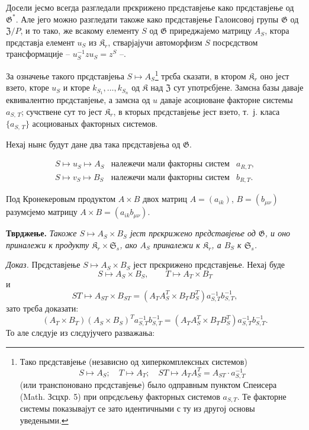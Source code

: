 \documentclass[11pt]{article}
\newcommand{\srcfn}[2]{\footnote{#2}}
\begin{document}
Досели јесмо всегда разгледали прєкрижено прєдставјење како прєдставјење од \(\mathfrak{G}^*\). Але јего можно разгледати такоже како прєдставјење Галоисовој групы \(\mathfrak{G}\) од \(\mathfrak Z/P\), и то тако, же всакому елементу \(S\) од \(\mathfrak{G}\) приреджајемо матрицу \(A_S\), ктора прєдставја елемент \(u_S\) из \(\mathfrak K_r\), стварјајучи автоморфизм \(S\) посрєдством трансформације -- \(u_S^{-1}zu_S=z^S\) --.

За означење такого прєдставјења \(S\mapsto A_S\)\srcfn{1}{Тако прєдставјење (независно од хиперкомплексных системов)
\[
S\mapsto A_S;\quad T\mapsto A_T;\quad ST\mapsto A_TA_S^T=A_{ST}\cdot a_{S,T}^{-1}
\]
(или транспоновано прєдставјење) было одправным пунктом Спеисера (Math. Зсцхр. 5) при опрєдєљењу факторных системов \(a_{S,T}\). Те факторне системы показывајут се зато идентичными с ту из другој основы уведеными.} трєба сказати, в ктором \(\mathfrak K_r\) оно јест взето, кторе \(u_S\) и кторе \(k_{S_1},\ldots,k_{S_n}\) од \(\mathfrak K\) над \(\mathfrak Z\) сут употрєбјене. Замєна базы даваје еквивалентно прєдставјење, а замєна од \(u\) даваје асоциоване факторне системы \(a_{S,\,T}\); сучствене сут то јест \(\mathfrak K_r\), в кторых прєдставјење јест взето, т.~ј. класа \(\{a_{S,\,T}\}\) асоциованых факторных системов.

Нехај нынє будут дане два така прєдставјења од \(\mathfrak G\).

\[
\begin{array}{lll}
S\mapsto u_S\mapsto A_S & \text{належечи мали факторны систем} & a_{R,T},\\
S\mapsto v_S\mapsto B_S & \text{належечи мали факторны систем} & b_{R,T}.
\end{array}
\]

Под Кронекеровым продуктом \(A\times B\) двох матриц \(A=(a_{ik})\), \(B=(b_{\mu\nu})\) разумєјемо матрицу \(A\times B=(a_{ik}b_{\mu\nu})\).

\noindent\textbf{Тврджење.} \emph{Такоже \(S\mapsto A_S\times B_S\) јест прєкрижено прєдставјење од \(\mathfrak G\), и оно приналежи к продукту \(\mathfrak K_r\times\mathfrak S_s\), ако \(A_S\) приналежи к \(\mathfrak K_r\), а \(B_S\) к \(\mathfrak S_s\).}

\noindent\emph{Доказ.} Прєдставјење \(S\mapsto A_S\times B_S\) јест прєкрижено прєдставјење. Нехај буде
\[
S\mapsto A_S\times B_S,\qquad T\mapsto A_T\times B_T
\]
и
\[
ST\mapsto A_{ST}\times B_{ST}
=(A_TA_S^T\times B_TB_S^T)a_{S,T}^{-1}b_{S,T}^{-1},
\]
зато трєба доказати:
\[
(A_T\times B_T)(A_S\times B_S)^T a_{S,T}^{-1}b_{S,T}^{-1}
=(A_TA_S^T\times B_TB_S^T)a_{S,T}^{-1}b_{S,T}^{-1}.
\]
То але слєдује из слєдујучего разважања:
\end{document}
